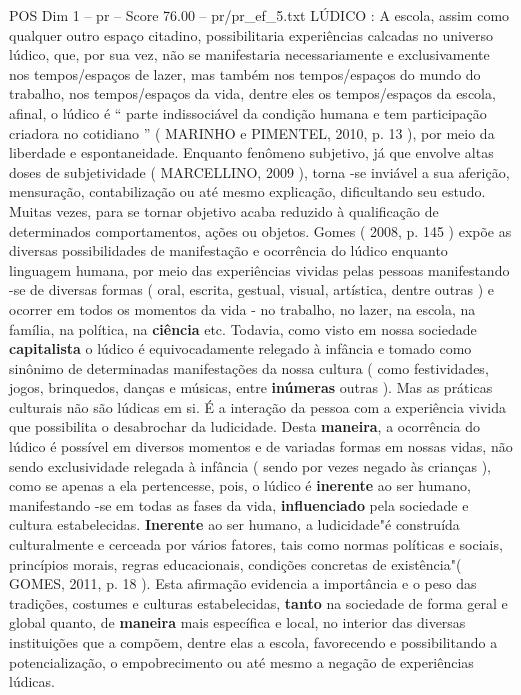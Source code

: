 \begin{textsample}{POS Dim 1 – pr – Score 76.00 – pr/pr\_ef\_5.txt}
LÚDICO : A escola, assim como qualquer outro espaço citadino, possibilitaria experiências calcadas no universo lúdico, que, por sua vez, não se manifestaria necessariamente e exclusivamente nos tempos/espaços de lazer, mas também nos tempos/espaços do mundo do trabalho, nos tempos/espaços da vida, dentre eles os tempos/espaços da escola, afinal, o lúdico é “ parte indissociável da condição humana e tem participação criadora no cotidiano ” ( MARINHO e PIMENTEL, 2010, p. 13 ), por meio da liberdade e espontaneidade.
Enquanto fenômeno subjetivo, já que envolve altas doses de subjetividade ( MARCELLINO, 2009 ), torna -se inviável a sua aferição, mensuração, contabilização ou até mesmo explicação, dificultando seu estudo.
Muitas vezes, para se tornar objetivo acaba reduzido à qualificação de determinados comportamentos, ações ou objetos.
Gomes ( 2008, p. 145 ) expõe as diversas possibilidades de manifestação e ocorrência do lúdico enquanto linguagem humana, por meio das experiências vividas pelas pessoas manifestando -se de diversas formas ( oral, escrita, gestual, visual, artística, dentre outras ) e ocorrer em todos os momentos da vida - no trabalho, no lazer, na escola, na família, na política, na \textbf{ciência} etc.
Todavia, como visto em nossa sociedade \textbf{capitalista} o lúdico é equivocadamente relegado à infância e tomado como sinônimo de determinadas manifestações da nossa cultura ( como festividades, jogos, brinquedos, danças e músicas, entre \textbf{inúmeras} outras ).
Mas as práticas culturais não são lúdicas em si.
É a interação da pessoa com a experiência vivida que possibilita o desabrochar da ludicidade.
Desta \textbf{maneira}, a ocorrência do lúdico é possível em diversos momentos e de variadas formas em nossas vidas, não sendo exclusividade relegada à infância ( sendo por vezes negado às crianças ), como se apenas a ela pertencesse, pois, o lúdico é \textbf{inerente} ao ser humano, manifestando -se em todas as fases da vida, \textbf{influenciado} pela sociedade e cultura estabelecidas. \textbf{Inerente} ao ser humano, a ludicidade"é construída culturalmente e cerceada por vários fatores, tais como normas políticas e sociais, princípios morais, regras educacionais, condições concretas de existência"( GOMES, 2011, p. 18 ).
Esta afirmação evidencia a importância e o peso das tradições, costumes e culturas estabelecidas, \textbf{tanto} na sociedade de forma geral e global quanto, de \textbf{maneira} mais específica e local, no interior das diversas instituições que a compõem, dentre elas a escola, favorecendo e possibilitando a potencialização, o empobrecimento ou até mesmo a negação de experiências lúdicas.

\end{textsample}
